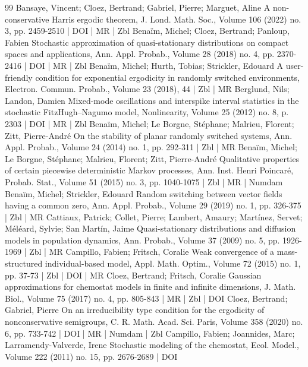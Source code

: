 \documentclass[10pt]{amsart}
\theoremstyle{definition}\newtheorem{defi}[theo]{Definition}\newtheorem{rema}[theo]{Remark}\newtheorem{exam}[theo]{Example}\newtheorem{exem}[theo]{Example}\newtheorem{nota}[theo]{Notation}
\newcommand{\1}{\mathbf{1}}
\begin{document}
\begin{thebibliography}{99}
 Bansaye, Vincent; Cloez, Bertrand; Gabriel, Pierre; Marguet, Aline A non-conservative Harris ergodic theorem, J. Lond. Math. Soc., Volume 106 (2022) no. 3, pp. 2459-2510 | DOI | MR | Zbl
 Benaïm, Michel; Cloez, Bertrand; Panloup, Fabien Stochastic approximation of quasi-stationary distributions on compact spaces and applications, Ann. Appl. Probab., Volume 28 (2018) no. 4, pp. 2370-2416 | DOI | MR | Zbl
 Benaïm, Michel; Hurth, Tobias; Strickler, Edouard A user-friendly condition for exponential ergodicity in randomly switched environments, Electron. Commun. Probab., Volume 23 (2018), 44 | Zbl | MR
 Berglund, Nils; Landon, Damien Mixed-mode oscillations and interspike interval statistics in the stochastic FitzHugh–Nagumo model, Nonlinearity, Volume 25 (2012) no. 8, p. 2303 | DOI | MR | Zbl
 Benaïm, Michel; Le Borgne, Stéphane; Malrieu, Florent; Zitt, Pierre-André On the stability of planar randomly switched systems, Ann. Appl. Probab., Volume 24 (2014) no. 1, pp. 292-311 | Zbl | MR
 Benaïm, Michel; Le Borgne, Stéphane; Malrieu, Florent; Zitt, Pierre-André Qualitative properties of certain piecewise deterministic Markov processes, Ann. Inst. Henri Poincaré, Probab. Stat., Volume 51 (2015) no. 3, pp. 1040-1075 | Zbl | MR | Numdam
 Benaïm, Michel; Strickler, Edouard Random switching between vector fields having a common zero, Ann. Appl. Probab., Volume 29 (2019) no. 1, pp. 326-375 | Zbl | MR
 Cattiaux, Patrick; Collet, Pierre; Lambert, Amaury; Martínez, Servet; Méléard, Sylvie; San Martín, Jaime Quasi-stationary distributions and diffusion models in population dynamics, Ann. Probab., Volume 37 (2009) no. 5, pp. 1926-1969 | Zbl | MR
 Campillo, Fabien; Fritsch, Coralie Weak convergence of a mass-structured individual-based model, Appl. Math. Optim., Volume 72 (2015) no. 1, pp. 37-73 | Zbl | DOI | MR
 Cloez, Bertrand; Fritsch, Coralie Gaussian approximations for chemostat models in finite and infinite dimensions, J. Math. Biol., Volume 75 (2017) no. 4, pp. 805-843 | MR | Zbl | DOI
 Cloez, Bertrand; Gabriel, Pierre On an irreducibility type condition for the ergodicity of nonconservative semigroups, C. R. Math. Acad. Sci. Paris, Volume 358 (2020) no. 6, pp. 733-742 | DOI | MR | Numdam | Zbl
 Campillo, Fabien; Joannides, Marc; Larramendy-Valverde, Irene Stochastic modeling of the chemostat, Ecol. Model., Volume 222 (2011) no. 15, pp. 2676-2689 | DOI

\end{thebibliography}
\end{document}
